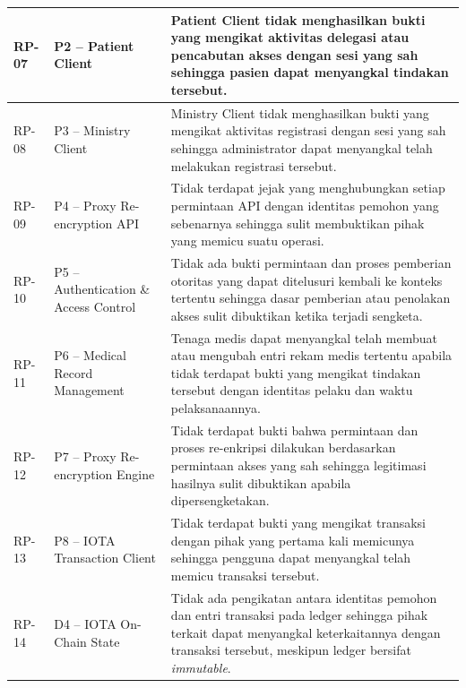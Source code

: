 \begin{xltabular}{\textwidth}{|>{\centering\arraybackslash}p{1.8cm}|>{\raggedright\arraybackslash}p{3.2cm}|X|}
    RP-07 &
    P2 -- Patient Client &
    Patient Client tidak menghasilkan bukti yang mengikat aktivitas delegasi atau pencabutan akses dengan sesi yang sah sehingga pasien dapat menyangkal tindakan tersebut. \\
    \hline

    RP-08 &
    P3 -- Ministry Client &
    Ministry Client tidak menghasilkan bukti yang mengikat aktivitas registrasi dengan sesi yang sah sehingga administrator dapat menyangkal telah melakukan registrasi tersebut. \\
    \hline

    RP-09 &
    P4 -- Proxy Re-encryption API &
    Tidak terdapat jejak yang menghubungkan setiap permintaan API dengan identitas pemohon yang sebenarnya sehingga sulit membuktikan pihak yang memicu suatu operasi. \\
    \hline

    RP-10 &
    P5 -- Authentication \& Access Control &
    Tidak ada bukti permintaan dan proses pemberian otoritas yang dapat ditelusuri kembali ke konteks tertentu sehingga dasar pemberian atau penolakan akses sulit dibuktikan ketika terjadi sengketa. \\
    \hline

    RP-11 &
    P6 -- Medical Record Management &
    Tenaga medis dapat menyangkal telah membuat atau mengubah entri rekam medis tertentu apabila tidak terdapat bukti yang mengikat tindakan tersebut dengan identitas pelaku dan waktu pelaksanaannya. \\
    \hline

    RP-12 &
    P7 -- Proxy Re-encryption Engine &
    Tidak terdapat bukti bahwa permintaan dan proses re-enkripsi dilakukan berdasarkan permintaan akses yang sah sehingga legitimasi hasilnya sulit dibuktikan apabila dipersengketakan. \\
    \hline

    RP-13 &
    P8 -- IOTA Transaction Client &
    Tidak terdapat bukti yang mengikat transaksi dengan pihak yang pertama kali memicunya sehingga pengguna dapat menyangkal telah memicu transaksi tersebut. \\
    \hline

    RP-14 &
    D4 -- IOTA On-Chain State &
    Tidak ada pengikatan antara identitas pemohon dan entri transaksi pada ledger sehingga pihak terkait dapat menyangkal keterkaitannya dengan transaksi tersebut, meskipun ledger bersifat \textit{immutable}. \\
    \hline

\end{xltabular}

